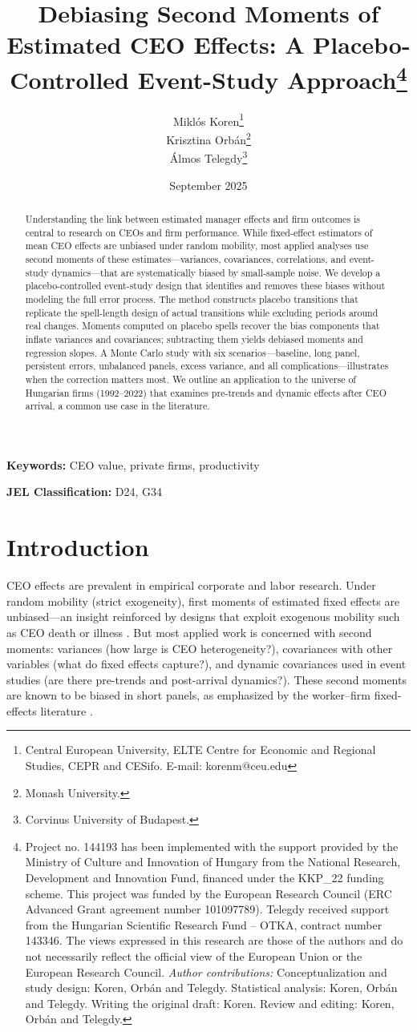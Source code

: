 \documentclass[11pt,a4paper]{article}
\title{Debiasing Second Moments of Estimated CEO Effects: A Placebo-Controlled Event-Study Approach\thanks{Project no. 144193 has been implemented with the support provided by the Ministry of Culture and Innovation of Hungary from the National Research, Development and Innovation Fund, financed under the KKP\_22 funding scheme. This project was funded by the European Research Council (ERC Advanced Grant agreement number 101097789). Telegdy received support from the Hungarian Scientific Research Fund – OTKA, contract number 143346. The views expressed in this research are those of the authors and do not necessarily reflect the official view of the European Union or the European Research Council. \emph{Author contributions:} Conceptualization and study design: Koren, Orbán and Telegdy. Statistical analysis: Koren, Orbán and Telegdy. Writing the original draft: Koren. Review and editing: Koren, Orbán and Telegdy.}}
\author{Miklós Koren\thanks{Central European University, ELTE Centre for Economic and Regional Studies, CEPR and CESifo. E-mail: korenm@ceu.edu} \\
        Krisztina Orbán\thanks{Monash University.} \\
        Álmos Telegdy\thanks{Corvinus University of Budapest.}}
\date{September 2025}
\begin{document}
\maketitle
\thispagestyle{empty}

\begin{abstract}
Understanding the link between estimated manager effects and firm outcomes is central to research on CEOs and firm performance. While fixed-effect estimators of mean CEO effects are unbiased under random mobility, most applied analyses use second moments of these estimates—variances, covariances, correlations, and event-study dynamics—that are systematically biased by small-sample noise. We develop a placebo-controlled event-study design that identifies and removes these biases without modeling the full error process. The method constructs placebo transitions that replicate the spell-length design of actual transitions while excluding periods around real changes. Moments computed on placebo spells recover the bias components that inflate variances and covariances; subtracting them yields debiased moments and regression slopes. A Monte Carlo study with six scenarios—baseline, long panel, persistent errors, unbalanced panels, excess variance, and all complications—illustrates when the correction matters most. We outline an application to the universe of Hungarian firms (1992--2022) that examines pre-trends and dynamic effects after CEO arrival, a common use case in the literature.
\end{abstract}

\textbf{Keywords:} CEO value, private firms, productivity

\textbf{JEL Classification:} D24, G34

\clearpage
\setcounter{page}{1}

\section{Introduction}

CEO effects are prevalent in empirical corporate and labor research. Under random mobility (strict exogeneity), first moments of estimated fixed effects are unbiased—an insight reinforced by designs that exploit exogenous mobility such as CEO death or illness \citep[e.g.,][]{bennedsen2020ceos}. But most applied work is concerned with second moments: variances (how large is CEO heterogeneity?), covariances with other variables (what do fixed effects capture?), and dynamic covariances used in event studies (are there pre-trends and post-arrival dynamics?). These second moments are known to be biased in short panels, as emphasized by the worker–firm fixed-effects literature \citep{andrews2008high,gaure2014correlation,Bonhomme2023-dx}.
\end{document}
